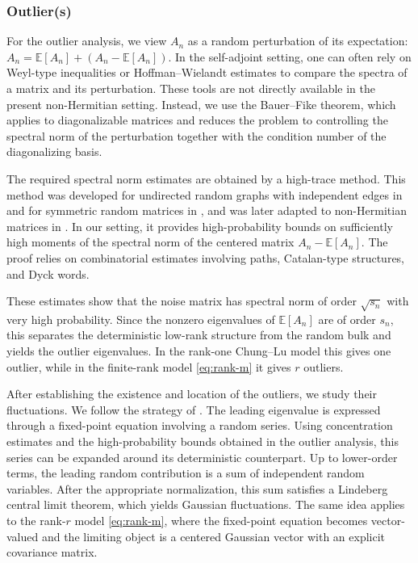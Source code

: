 \documentclass[11pt,oneside]{amsart}
\theoremstyle{plain}
\numberwithin{equation}{section}
\newcommand{\scaling}{s_n}
\begin{document}
 \subsubsection*{Outlier(s)} 
 For the outlier analysis, we view $A_n$ as a random perturbation of its expectation:
$A_n=\mathbb E[A_n]+(A_n-\mathbb E[A_n])$.  In the self-adjoint setting, one can often rely on Weyl-type inequalities or Hoffman--Wielandt estimates to compare the spectra of a matrix and its perturbation. These tools are not directly available in the present non-Hermitian setting. Instead, we use the Bauer--Fike theorem, which applies to diagonalizable matrices and reduces the problem to controlling the spectral norm of the perturbation together with the condition number of the diagonalizing basis.

The required spectral norm estimates are obtained by a high-trace method. This method was developed for undirected random graphs with independent edges in \cite{FK,ChungLu} and for symmetric random matrices in \cite{Vu}, and was later adapted to non-Hermitian matrices in \cite{TV,B,Coste}. In our setting, it provides high-probability bounds on sufficiently high moments of the spectral norm of the centered matrix $A_n-\mathbb E[A_n]$. The proof relies on combinatorial estimates involving paths, Catalan-type structures, and Dyck words.

These estimates show that the noise matrix has spectral norm of order $\sqrt{\scaling}$ with very high probability. Since the nonzero eigenvalues of $\mathbb E[A_n]$ are of order $\scaling$, this separates the deterministic low-rank structure from the random bulk and yields the outlier eigenvalues. In the rank-one Chung--Lu model this gives one outlier, while in the finite-rank model \eqref{eq:rank-m} it gives $r$ outliers.

After establishing the existence and location of the outliers, we study their fluctuations. We follow the strategy of \cite{EKetal,CCH}. The leading eigenvalue is expressed through a fixed-point equation involving a random series. Using concentration estimates and the high-probability bounds obtained in the outlier analysis, this series can be expanded around its deterministic counterpart. Up to lower-order terms, the leading random contribution is a sum of independent random variables. After the appropriate normalization, this sum satisfies a Lindeberg central limit theorem, which yields Gaussian fluctuations. The same idea applies to the rank-$r$ model \eqref{eq:rank-m}, where the fixed-point equation becomes vector-valued and the limiting object is a centered Gaussian vector with an explicit covariance matrix.
\end{document}
